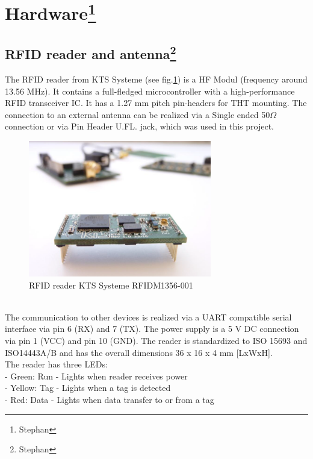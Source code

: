 \section[Hardware]{Hardware\footnote{Stephan}}\label{Sec_Har}

\subsection[RFID reader and antenna]{RFID reader and antenna\footnote{Stephan}}
The RFID reader from KTS Systeme (see fig.\ref{Reader}) is a HF Modul (frequency around 13.56 MHz). It contains a full-fledged microcontroller with a high-performance RFID transceiver IC. It has a 1.27 mm pitch pin-headers for THT mounting. The connection to an external antenna can be realized via a Single ended 50$\Omega$ connection or via Pin Header U.FL. jack, which was used in this project. \\
\begin{figure}[!htbp]
\centering
\includegraphics[width = 8cm]{Pictures/Reader}
\caption{RFID reader KTS Systeme RFIDM1356-001}
\label{Reader}
\end{figure}\\
The communication to other devices is realized via a UART compatible serial interface via pin 6 (RX) and 7 (TX). The power supply is a 5 V DC connection via pin 1 (VCC) and pin 10 (GND). The reader is standardized to ISO 15693 and ISO14443A/B and has the overall dimensions 36 x 16 x 4 mm [LxWxH]\cite{KTSSysteme.2017}.\\
The reader has three LEDs:\\
- Green: Run - Lights when reader receives power\\
- Yellow: Tag - Lights when a tag is detected\\
- Red: Data - Lights when data transfer to or from a tag\\

